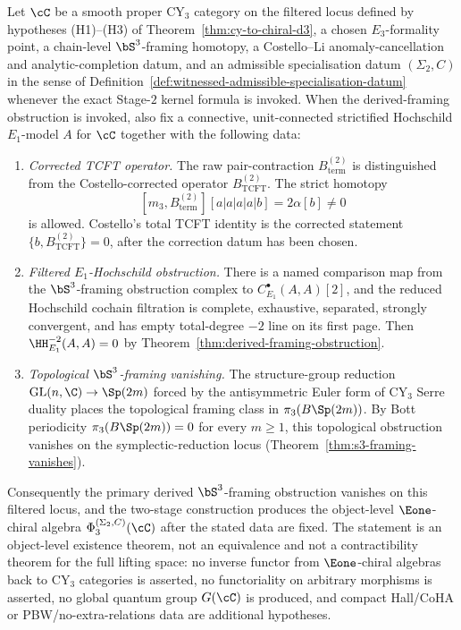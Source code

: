 \begin{theorem}
\label{thm:cya3-existence-rigidity}
Let $\cC$ be a smooth proper CY$_3$ category on the filtered locus
defined by hypotheses \textup{(H1)--(H3)} of
Theorem~\ref{thm:cy-to-chiral-d3}, a chosen $E_3$-formality point, a
chain-level $\bS^3$-framing homotopy, a Costello--Li
anomaly-cancellation and analytic-completion datum, and an
admissible specialisation datum $(\Sigma_2,C)$ in the sense of
Definition~\ref{def:witnessed-admissible-specialisation-datum} whenever
the exact Stage-$2$ kernel formula is invoked. When the derived-framing
obstruction is invoked, also fix a connective, unit-connected
strictified Hochschild $E_1$-model $A$ for $\cC$ together with the
following data:
\begin{enumerate}[label=\textup{(\roman*)}]
 \item \emph{Corrected TCFT operator.} The raw pair-contraction
 $B^{(2)}_{\mathrm{term}}$ is distinguished from the Costello-corrected
 operator $B^{(2)}_{\mathrm{TCFT}}$. The strict homotopy
 \[
  [m_3,B^{(2)}_{\mathrm{term}}][a|a|a|a|b]=2\alpha[b]\neq0
 \]
 is allowed. Costello's total TCFT identity is the corrected statement
 $\{b,B^{(2)}_{\mathrm{TCFT}}\}=0$, after the correction datum has been
 chosen.
 \item \emph{Filtered $E_1$-Hochschild obstruction.} There is a named
 comparison map from the $\bS^3$-framing obstruction complex to
 $C^\bullet_{E_1}(A,A)[2]$, and the reduced Hochschild cochain
 filtration is complete, exhaustive, separated, strongly convergent,
 and has empty total-degree $-2$ line on its first page. Then
 $\HH^{-2}_{E_1}(A,A)=0$ by
 Theorem~\ref{thm:derived-framing-obstruction}.
 \item \emph{Topological $\bS^3$-framing vanishing.} The structure-group
 reduction $\mathrm{GL}(n, \C) \to \Sp(2m)$ forced by the antisymmetric
 Euler form of CY$_3$ Serre duality places the topological framing class
 in $\pi_3(B\Sp(2m))$. By Bott periodicity
 $\pi_3(B\Sp(2m)) = 0$ for every $m \geq 1$, this topological
 obstruction vanishes on the symplectic-reduction locus
 \textup{(}Theorem~\ref{thm:s3-framing-vanishes}\textup{).}
\end{enumerate}
Consequently the primary derived $\bS^3$-framing obstruction vanishes on
this filtered locus, and the two-stage construction produces
the object-level $\Eone$-chiral algebra
$\Phi_3^{(\Sigma_2,C)}(\cC)$ after the stated data are fixed. The
statement is an object-level existence theorem, not an equivalence and
not a contractibility theorem for the full lifting space: no inverse
functor from $\Eone$-chiral algebras back to CY$_3$ categories is
asserted, no functoriality on arbitrary morphisms is asserted, no global
quantum group $G(\cC)$ is produced, and compact Hall/CoHA or
PBW/no-extra-relations data are additional hypotheses.
\end{theorem}

